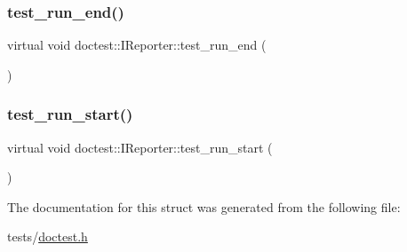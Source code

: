 \mbox{\label{structdoctest_1_1IReporter_a610495b7caa29e36b5ea62bff62952ed}} 
\subsubsection{\texorpdfstring{test\+\_\+run\+\_\+end()}{test\_run\_end()}}
{\footnotesize\ttfamily virtual void doctest\+::\+I\+Reporter\+::test\+\_\+run\+\_\+end (\begin{DoxyParamCaption}\item[{const \hyperlink{structdoctest_1_1TestRunStats}{Test\+Run\+Stats} \&}]{ }\end{DoxyParamCaption})\hspace{0.3cm}{\ttfamily [pure virtual]}}

\mbox{\label{structdoctest_1_1IReporter_a7f4a4b654726d4b266c91cc0e1569f96}} 
\subsubsection{\texorpdfstring{test\+\_\+run\+\_\+start()}{test\_run\_start()}}
{\footnotesize\ttfamily virtual void doctest\+::\+I\+Reporter\+::test\+\_\+run\+\_\+start (\begin{DoxyParamCaption}{ }\end{DoxyParamCaption})\hspace{0.3cm}{\ttfamily [pure virtual]}}



The documentation for this struct was generated from the following file\+:\begin{DoxyCompactItemize}
\item 
tests/\hyperlink{doctest_8h}{doctest.\+h}\end{DoxyCompactItemize}

